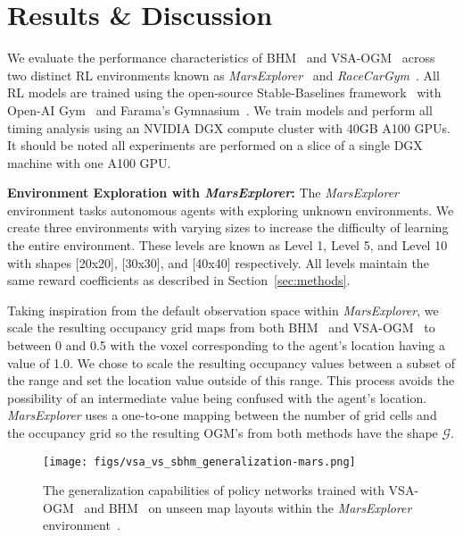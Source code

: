 \section{Results \& Discussion}
\label{sec:results}


\noindent
We evaluate the performance characteristics of BHM~\cite{senanayake2017bayesian} and VSA-OGM~\cite{snyder2024brain} across two distinct RL environments known as \textit{MarsExplorer}~\cite{Koutras2021MarsExplorer} and \textit{RaceCarGym}~\cite{Brunnbauer_racecar_gym}. All RL models are trained using the open-source Stable-Baselines framework~\cite{stable-baselines3} with Open-AI Gym~\cite{1606.01540} and Farama's Gymnasium~\cite{towers2024gymnasiumstandardinterfacereinforcement}. We train models and perform all timing analysis using an NVIDIA DGX compute cluster with 40GB A100 GPUs. It should be noted all experiments are performed on a slice of a single DGX machine with one A100 GPU.

\textbf{Environment Exploration with \textit{MarsExplorer}:} The \textit{MarsExplorer} environment tasks autonomous agents with exploring unknown environments. We create three environments with varying sizes to increase the difficulty of learning the entire environment. These levels are known as Level 1, Level 5, and Level 10 with shapes [20x20], [30x30], and [40x40] respectively. All levels maintain the same reward coefficients as described in Section~\ref{sec:methods}.

Taking inspiration from the default observation space within \textit{MarsExplorer}, we scale the resulting occupancy grid maps from both BHM~\cite{senanayake2017bayesian} and VSA-OGM~\cite{snyder2024brain} to between 0 and 0.5 with the voxel corresponding to the agent's location having a value of 1.0. 
We chose to scale the resulting occupancy values between a subset of the range and set the location value outside of this range. This process avoids the possibility of an intermediate value being confused with the agent's location.
\textit{MarsExplorer} uses a one-to-one mapping between the number of grid cells and the occupancy grid so the resulting OGM's from both methods have the shape $\mathcal{G}$.

\begin{figure}
    \centering
    \texttt{[image: figs/vsa\_vs\_sbhm\_generalization-mars.png]}
    \caption{The generalization capabilities of policy networks trained with VSA-OGM~\cite{snyder2024brain} and BHM~\cite{senanayake2017bayesian} on unseen map layouts within the \textit{MarsExplorer} environment~\cite{Koutras2021MarsExplorer}.}
    \label{fig:mars-generalization}
\end{figure}

